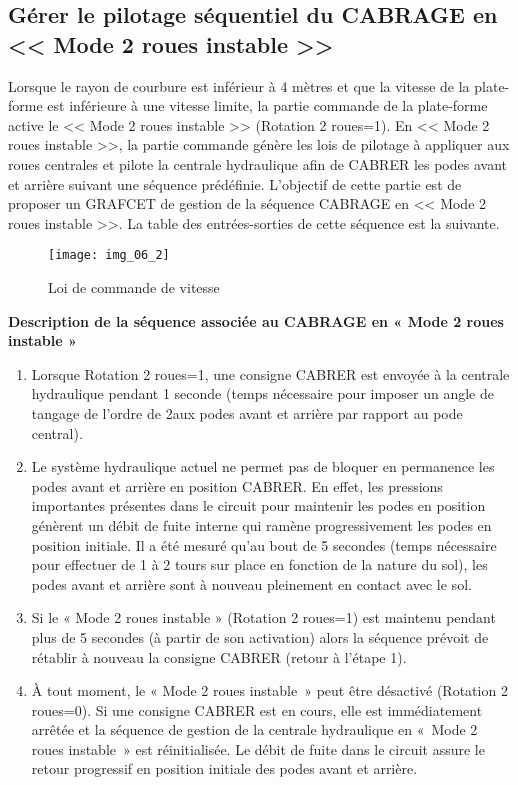 \subsection{Gérer le pilotage séquentiel du CABRAGE en << Mode 2 roues instable >>}
Lorsque le rayon de courbure est inférieur à 4 mètres et que la vitesse de la plate-forme est inférieure à une vitesse
limite, la partie commande de la plate-forme active le << Mode 2 roues instable >> (Rotation 2 roues=1). En << Mode 2 roues instable >>, la partie commande génère les lois de pilotage à appliquer aux roues centrales et pilote la centrale hydraulique afin de CABRER les podes avant et arrière suivant une séquence prédéfinie.
L’objectif de cette partie est de proposer un GRAFCET de gestion de la
séquence CABRAGE en << Mode 2 roues instable >>. La table des
entrées-sorties de cette séquence est la suivante.

\begin{figure}[H]
\centering
\texttt{[image: img\_06\_2]}
\caption{Loi de commande de vitesse \label{img:06:2}}
\end{figure}

\textbf{Description de la séquence associée au CABRAGE en « Mode 2 roues instable »}

\begin{enumerate}
\item Lorsque Rotation 2 roues=1, une consigne CABRER est envoyée à la centrale hydraulique pendant 1 seconde (temps nécessaire pour imposer un angle de tangage de l’ordre de 2\ieme aux podes avant et arrière par rapport au pode central).
\item Le système hydraulique actuel ne permet pas de bloquer en permanence les podes avant et arrière en position CABRER. En effet, les pressions importantes présentes dans le circuit pour maintenir les podes en position génèrent un débit de fuite interne qui ramène progressivement les podes en position initiale. Il a été mesuré qu’au bout de 5 secondes (temps nécessaire pour effectuer de 1 à 2 tours sur place en fonction de la nature du sol), les podes avant et arrière sont à nouveau pleinement en contact avec le sol.
\item Si le « Mode 2 roues instable » (Rotation 2 roues=1) est maintenu pendant plus de 5 secondes (à partir de son activation) alors la séquence prévoit de rétablir à nouveau la consigne CABRER (retour à l’étape 1).
\item À tout moment, le « Mode 2 roues instable~» peut être désactivé (Rotation 2 roues=0). Si une consigne CABRER est en cours, elle est immédiatement arrêtée et la séquence de gestion de la centrale hydraulique en «~Mode 2 roues instable~» est réinitialisée. Le débit de fuite dans le circuit assure le retour progressif en
position initiale des podes avant et arrière.
\end{enumerate}

